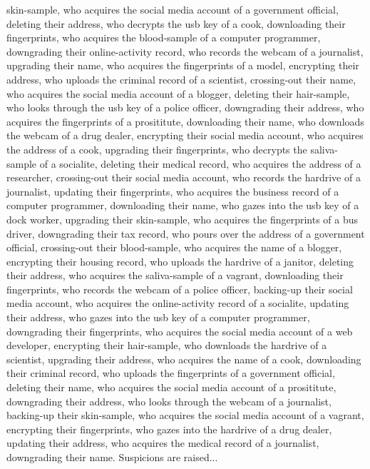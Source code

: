 \documentclass{report}
\begin{document}
skin-sample, who acquires the social media account of a government official, deleting their address, who decrypts the usb key of a cook, downloading their fingerprints, who acquires the blood-sample of a computer programmer, downgrading their online-activity record, who records the webcam of a journalist, upgrading their name, who acquires the fingerprints of a model, encrypting their address, who uploads the criminal record of a scientist, crossing-out their name, who acquires the social media account of a blogger, deleting their hair-sample, who looks through the usb key of a police officer, downgrading their address, who acquires the fingerprints of a prosititute, downloading their name, who downloads the webcam of a drug dealer, encrypting their social media account, who acquires the address of a cook, upgrading their fingerprints, who decrypts the saliva-sample of a socialite, deleting their medical record, who acquires the address of a researcher, crossing-out their social media account, who records the hardrive of a journalist, updating their fingerprints, who acquires the business record of a computer programmer, downloading their name, who gazes into the usb key of a dock worker, upgrading their skin-sample, who acquires the fingerprints of a bus driver, downgrading their tax record, who pours over the address of a government official, crossing-out their blood-sample, who acquires the name of a blogger, encrypting their housing record, who uploads the hardrive of a janitor, deleting their address, who acquires the saliva-sample of a vagrant, downloading their fingerprints, who records the webcam of a police officer, backing-up their social media account, who acquires the online-activity record of a socialite, updating their address, who gazes into the usb key of a computer programmer, downgrading their fingerprints, who acquires the social media account of a web developer, encrypting their hair-sample, who downloads the hardrive of a scientist, upgrading their address, who acquires the name of a cook, downloading their criminal record, who uploads the fingerprints of a government official, deleting their name, who acquires the social media account of a prosititute, downgrading their address, who looks through the webcam of a journalist, backing-up their skin-sample, who acquires the social media account of a vagrant, encrypting their fingerprints, who gazes into the hardrive of a drug dealer, updating their address, who acquires the medical record of a journalist, downgrading their name. Suspicions are raised...
\end{document}
